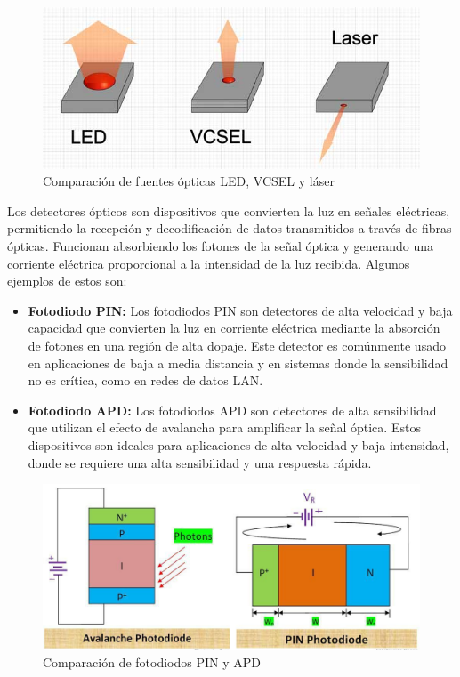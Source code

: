 \begin{enumerate}
\begin{itemize}
	\end{itemize}
	\begin{figure}
		\centering
		\includegraphics[width=0.7\linewidth]{img/Figure_2_0}
		\caption{Comparación de fuentes ópticas LED, VCSEL y láser}
		\label{fig:3}
	\end{figure}
	Los detectores ópticos son dispositivos que convierten la luz en señales eléctricas, permitiendo la recepción y decodificación de datos transmitidos a través de fibras ópticas. Funcionan absorbiendo los fotones de la señal óptica y generando una corriente eléctrica proporcional a la intensidad de la luz recibida. Algunos ejemplos de estos son:
	\begin{itemize}
		\item \textbf{Fotodiodo PIN:} Los fotodiodos PIN son detectores de alta velocidad y baja capacidad que convierten la luz en corriente eléctrica mediante la absorción de fotones en una región de alta dopaje. Este detector es comúnmente usado en aplicaciones de baja a media distancia y en sistemas donde la sensibilidad no es crítica, como en redes de datos LAN.
		\item \textbf{Fotodiodo APD:} Los fotodiodos APD son detectores de alta sensibilidad que utilizan el efecto de avalancha para amplificar la señal óptica. Estos dispositivos son ideales para aplicaciones de alta velocidad y baja intensidad, donde se requiere una alta sensibilidad y una respuesta rápida. 
	\end{itemize}
\begin{figure}
	\centering
	\includegraphics[width=0.7\linewidth]{img/Figure_2_1}
	\caption{Comparación de fotodiodos PIN y APD}
	\label{fig:4}
\end{figure}

\end{enumerate}

